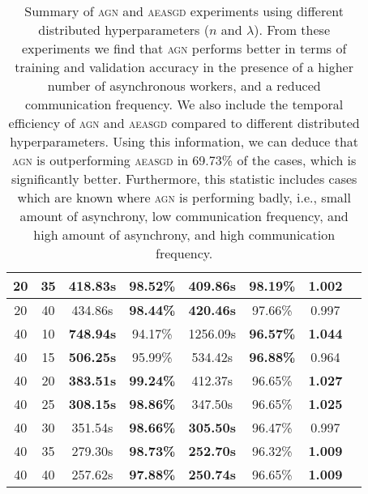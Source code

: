 \documentclass[wcp]{jmlr}
\begin{document}
\begin{table}
\begin{tabular}{|c|c|c|c|c|c|c|c|}
\hline
20 & 35 & 418.83s & \textbf{98.52\%} & \textbf{409.86s} & 98.19\% & \textbf{1.002} \\
\hline
20 & 40 & 434.86s & \textbf{98.44\%} & \textbf{420.46s} & 97.66\% & 0.997 \\
\hline
40 & 10 & \textbf{748.94s} & 94.17\% & 1256.09s & \textbf{96.57\%} & \textbf{1.044}  \\
\hline
40 & 15 & \textbf{506.25s} & 95.99\% & 534.42s & \textbf{96.88\%} & 0.964 \\
\hline
40 & 20 & \textbf{383.51s} & \textbf{99.24\%} & 412.37s & 96.65\% & \textbf{1.027} \\
\hline
40 & 25 & \textbf{308.15s} & \textbf{98.86\%} & 347.50s & 96.65\% & \textbf{1.025}  \\
\hline
40 & 30 & 351.54s & \textbf{98.66\%} & \textbf{305.50s} & 96.47\% & 0.997 \\
\hline
40 & 35 & 279.30s & \textbf{98.73\%} & \textbf{252.70s} & 96.32\% & \textbf{1.009} \\
\hline
40 & 40 & 257.62s & \textbf{97.88\%} & \textbf{250.74s} & 96.65\% & \textbf{1.009} \\
\hline
  \end{tabular}
  \caption{Summary of \textsc{agn} and \textsc{aeasgd} experiments using different distributed hyperparameters ($n$ and $\lambda$). From these experiments we find that \textsc{agn} performs better in terms of training and validation accuracy in the presence of a higher number of asynchronous workers, and a reduced communication frequency. We also include the temporal efficiency of \textsc{agn} and \textsc{aeasgd} compared to different distributed hyperparameters. Using this information, we can deduce that \textsc{agn} is outperforming \textsc{aeasgd} in 69.73\% of the cases, which is significantly better. Furthermore, this statistic includes cases which are known where \textsc{agn} is performing badly, i.e., small amount of asynchrony, low communication frequency, and high amount of asynchrony, and high communication frequency.}
  \label{table:agn_experiments_summary}
\end{table}
\end{document}
